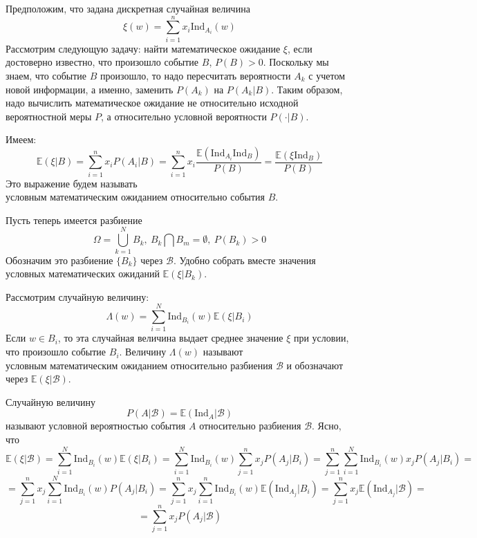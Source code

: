 Предположим, что задана дискретная случайная величина
\[
    \xi\left(w\right) = \sum_{i = 1}^{n} x_i \text{Ind}_{A_i}\left(w\right)
\]
Рассмотрим следующую задачу: найти математическое ожидание $\xi$, если достоверно известно, что произошло событие $B$, $P\left(B\right) > 0$. Поскольку мы знаем, что событие $B$ произошло, то надо пересчитать вероятности $A_k$ с учетом новой информации, а именно, заменить $P\left(A_k\right)$ на $P\left(A_k | B\right)$. Таким образом, надо вычислить математическое ожидание не относительно исходной вероятностной меры $P$, а относительно условной вероятности $P\left(\cdot | B\right)$. 
\begin{definition}
Имеем:
\[
    \mathbb{E}\left(\xi | B\right) = \sum_{i = 1}^{n} x_i P\left(A_i | B\right) =
    \sum_{i = 1}^{n} x_i \frac{\mathbb{E} \left(\text{Ind}_{A_i} \text{Ind}_{B}\right)}{P\left(B\right)} = \frac{\mathbb{E}\left(\xi \text{Ind}_{B}\right)}{P\left(B\right)}
\]
Это выражение будем называть $\textit{условным математическим ожиданием относительно события B}$.

\end{definition}

Пусть теперь имеется разбиение 
\[
    \Omega = \bigcup_{k = 1}^{N} B_k, \ B_k \bigcap B_m = \emptyset, \ P\left(B_k\right) > 0
\]
Обозначим это разбиение $\{B_k\}$ через $\mathcal{B}$. Удобно собрать вместе значения условных математических ожиданий $\mathbb{E}\left(\xi | B_k\right)$.
\begin{definition}
Рассмотрим случайную величину: 
\[
    \Lambda\left(w\right) = \sum_{i = 1}^{N} \text{Ind}_{B_i}\left(w\right) \mathbb{E} \left(\xi | B_i\right)
\]
Если $w \in B_i$, то эта случайная величина выдает среднее значение $\xi$ при условии, что произошло событие $B_i$. Величину $\Lambda\left(w\right)$ называют $\textit{условным математическим ожиданием относительно разбиения}$ $ \mathcal{B}$ и обозначают через $\mathbb{E} \left(\xi | \mathcal{B}\right)$.
\end{definition}
Случайную величину
\[
    P\left(A | \mathcal{B}\right) = \mathbb{E}\left(\text{Ind}_A | \mathcal{B}\right)
\]
называют условной вероятностью события $A$ относительно разбиения $\mathcal{B}$. Ясно, что 
\[
    \mathbb{E}\left(\xi | \mathcal{B}\right) = \sum_{i = 1}^{N} \text{Ind}_{B_i}\left(w\right) \mathbb{E} \left(\xi | B_i\right) 
    = \sum_{i = 1}^{N} \text{Ind}_{B_i}\left(w\right) \sum_{j = 1}^{n} x_j P\left(A_j | B_i\right)
    = \sum_{j = 1}^{n} \sum_{i = 1}^{N} \text{Ind}_{B_i}\left(w\right) x_j P\left(A_j | B_i\right)
    = 
\]
\[
    = \sum_{j = 1}^{n} x_j \sum_{i = 1}^{N} \text{Ind}_{B_i}\left(w\right) P\left(A_j | B_i\right)
    = \sum_{j = 1}^{n} x_j \sum_{i = 1}^{n} \text{Ind}_{B_i}\left(w\right) \mathbb{E}\left(\text{Ind}_{A_j} | B_i\right) = \sum_{j = 1}^{n} x_j \mathbb{E} \left(\text{Ind}_{A_j} | \mathcal{B}\right)= 
\]
\[
    = \sum_{j = 1}^{n} x_j P\left(A_j | \mathcal{B}\right)
\]

